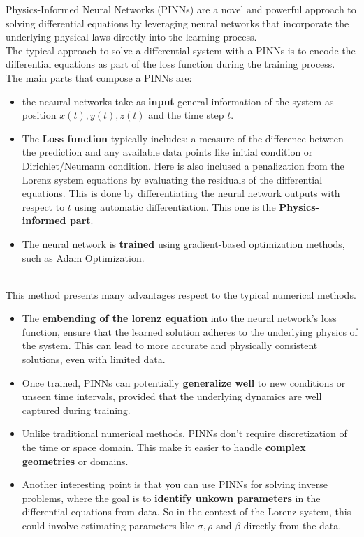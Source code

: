 Physics-Informed Neural Networks (PINNs) are a novel and powerful approach to solving differential equations by leveraging neural networks that incorporate the underlying physical laws directly into the learning process. 
\\The typical approach to solve a differential system with a PINNs is to encode the differential equations as part of the loss function during the training process.
\\The main parts that compose a PINNs are:
\begin{itemize}
    \item the neaural networks take as \textbf{input} general information of the system as position $x(t), y(t), z(t)$ and the time step $t$.
    \item The \textbf{Loss function} typically includes: a measure of the difference between the prediction and any available data points like initial condition or Dirichlet/Neumann condition. Here is also inclused a penalization from the Lorenz system equations by evaluating the residuals of the differential equations. This is done by differentiating the neural network outputs with respect to $t$ using automatic differentiation. This one is the \textbf{Physics-informed part}.
    \item The neural network is \textbf{trained} using gradient-based optimization methods, such as Adam Optimization.
\end{itemize}\\
This method presents many advantages respect to the typical numerical methods.
\begin{itemize}
    \item The \textbf{embending of the lorenz equation} into the neural network's loss function, ensure that the learned solution adheres to the underlying physics of the system. This can lead to more accurate and physically consistent solutions, even with limited data.
    \item Once trained, PINNs can potentially \textbf{generalize well} to new conditions or unseen time intervals, provided that the underlying dynamics are well captured during training.
    \item Unlike traditional numerical methods, PINNs don't require discretization of the time or space domain. This make it easier to handle \textbf{complex geometries} or domains.
    \item Another interesting point is that you can use PINNs for solving inverse problems, where the goal is to \textbf{identify unkown parameters} in the differential equations from data. So in the context of the Lorenz system, this could involve estimating parameters like $\sigma, \rho \text{ and } \beta$ directly from the data. 
\end{itemize}\\

